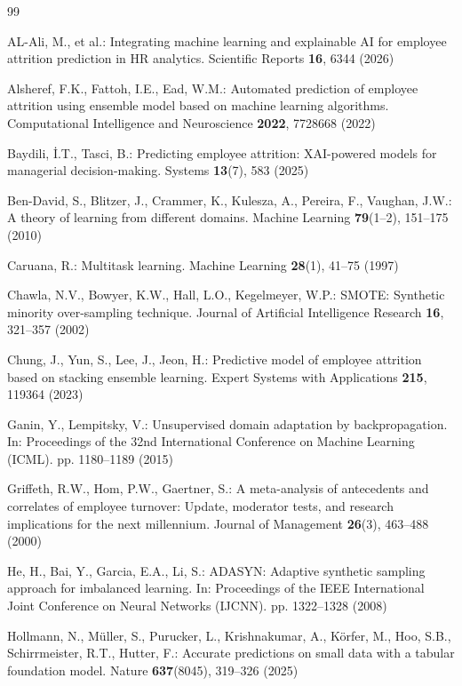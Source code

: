 \documentclass[runningheads]{llncs}
\begin{document}
\begin{thebibliography}{99}

AL-Ali, M., et al.: Integrating machine learning and explainable AI for employee attrition prediction in HR analytics. Scientific Reports \textbf{16}, 6344 (2026)

Alsheref, F.K., Fattoh, I.E., Ead, W.M.: Automated prediction of employee attrition using ensemble model based on machine learning algorithms. Computational Intelligence and Neuroscience \textbf{2022}, 7728668 (2022)

Baydili, \.{I}.T., Tasci, B.: Predicting employee attrition: XAI-powered models for managerial decision-making. Systems \textbf{13}(7), 583 (2025)

Ben-David, S., Blitzer, J., Crammer, K., Kulesza, A., Pereira, F., Vaughan, J.W.: A theory of learning from different domains. Machine Learning \textbf{79}(1--2), 151--175 (2010)

Caruana, R.: Multitask learning. Machine Learning \textbf{28}(1), 41--75 (1997)

Chawla, N.V., Bowyer, K.W., Hall, L.O., Kegelmeyer, W.P.: SMOTE: Synthetic minority over-sampling technique. Journal of Artificial Intelligence Research \textbf{16}, 321--357 (2002)

Chung, J., Yun, S., Lee, J., Jeon, H.: Predictive model of employee attrition based on stacking ensemble learning. Expert Systems with Applications \textbf{215}, 119364 (2023)

Ganin, Y., Lempitsky, V.: Unsupervised domain adaptation by backpropagation. In: Proceedings of the 32nd International Conference on Machine Learning (ICML). pp. 1180--1189 (2015)

Griffeth, R.W., Hom, P.W., Gaertner, S.: A meta-analysis of antecedents and correlates of employee turnover: Update, moderator tests, and research implications for the next millennium. Journal of Management \textbf{26}(3), 463--488 (2000)

He, H., Bai, Y., Garcia, E.A., Li, S.: ADASYN: Adaptive synthetic sampling approach for imbalanced learning. In: Proceedings of the IEEE International Joint Conference on Neural Networks (IJCNN). pp. 1322--1328 (2008)

Hollmann, N., Müller, S., Purucker, L., Krishnakumar, A., Körfer, M., Hoo, S.B., Schirrmeister, R.T., Hutter, F.: Accurate predictions on small data with a tabular foundation model. Nature \textbf{637}(8045), 319--326 (2025)


\end{thebibliography}
\end{document}
